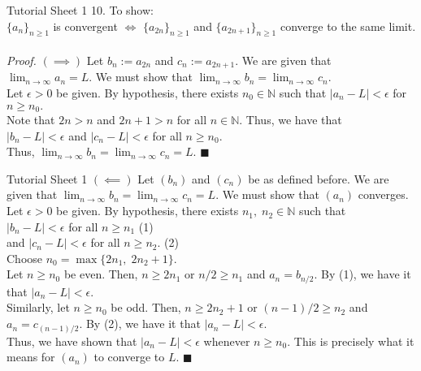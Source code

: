 \documentclass[aspectratio=169]{beamer}
\begin{document}
\begin{frame}{Tutorial Sheet 1}
	10. To show:\\
	$\{a_n\}_{n \ge 1}$ is convergent $\iff$ $\{a_{2n}\}_{n \ge 1}$ and $\{a_{2n+1}\}_{n \ge 1}$ converge to the same limit. \\~\\
	\emph{Proof.} $(\implies)$ Let $b_n := a_{2n}$ and $c_n := a_{2n+1}.$ We are given that $\displaystyle\lim_{n\to \infty}a_n = L.$ We must show that $\displaystyle\lim_{n\to \infty}b_n = \lim_{n\to \infty}c_n.$ \\
	Let $\epsilon > 0$ be given. By hypothesis, there exists $n_0 \in \mathbb{N}$ such that $|a_n - L| < \epsilon$ for $n \ge n_0.$ \\
	Note that $2n > n$ and $2n + 1 > n$ for all $n \in \mathbb{N}.$ Thus, we have that \\
	$|b_{n} - L| < \epsilon$ and $|c_n - L| < \epsilon$ for all $n \ge n_0.$ \\
	Thus, $\displaystyle\lim_{n\to \infty}b_n = \lim_{n\to \infty}c_n = L.$ \hfill $\blacksquare$ 
\end{frame}

\begin{frame}{Tutorial Sheet 1}
	$(\impliedby)$ Let $(b_n)$ and $(c_n)$ be as defined before. We are given that $\displaystyle\lim_{n\to \infty}b_n = \displaystyle\lim_{n\to \infty}c_n = L.$ We must show that $(a_n)$ converges.\\
	Let $\epsilon > 0$ be given. By hypothesis, there exists $n_1, \; n_2 \in \mathbb{N}$ such that \\
	$|b_n - L| < \epsilon$ for all $n \ge n_1$ \hfill (1) \\
	 and $|c_n - L| < \epsilon$ for all $n \ge n_2.$ \hfill (2) \\
	Choose $n_0 = \max\{2n_1,\;2n_2+1\}.$ \\
	Let $n \ge n_0$ be even. Then, $n \ge 2n_1$ or $n/2 \ge n_1$ and $a_n = b_{n/2}.$ By (1), we have it that $|a_n - L| < \epsilon.$ \\
	Similarly, let $n \ge n_0$ be odd. Then, $n \ge 2n_2 + 1$ or $(n-1)/2 \ge n_2$ and $a_n = c_{(n-1)/2}.$ By (2), we have it that $|a_n - L| < \epsilon.$ \\
	Thus, we have shown that $|a_n - L| < \epsilon$ whenever $n \ge n_0.$ This is precisely what it means for $(a_n)$ to converge to $L.$ \hfill $\blacksquare$
\end{frame}
\end{document}
